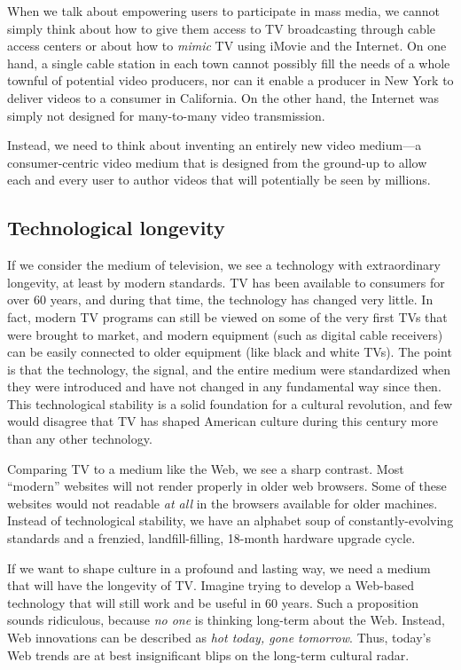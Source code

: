 \documentclass[12pt]{article}
\begin{document}
When we talk about empowering users to participate in mass media, we cannot simply think about how to give them access to TV broadcasting through cable access centers or about how to {\it mimic} TV using iMovie and the Internet.
On one hand, a single cable station in each town cannot possibly fill the needs of a whole townful of potential video producers, nor can it enable a producer in New York to deliver videos to a consumer in California.
On the other hand, the Internet was simply not designed for many-to-many video transmission.

Instead, we need to think about inventing an entirely new video medium---a consumer-centric video medium that is designed from the ground-up to allow each and every user to author videos that will potentially be seen by millions.

\subsection{Technological longevity}

If we consider the medium of television, we see a technology with extraordinary longevity, at least by modern standards.
TV has been available to consumers for over 60 years, and during that time, the technology has changed very little.
In fact, modern TV programs can still be viewed on some of the very first TVs that were brought to market, and modern equipment (such as digital cable receivers) can be easily connected to older equipment (like black and white TVs).
The point is that the technology, the signal, and the entire medium were standardized when they were introduced and have not changed in any fundamental way since then.
This technological stability is a solid foundation for a cultural revolution, and few would disagree that TV has shaped American culture during this century more than any other technology.

Comparing TV to a medium like the Web, we see a sharp contrast.
Most ``modern'' websites will not render properly in older web browsers.
Some of these websites would not readable {\it at all} in the browsers available for older machines.
Instead of technological stability, we have an alphabet soup of constantly-evolving standards and a frenzied, landfill-filling, 18-month hardware upgrade cycle.

If we want to shape culture in a profound and lasting way, we need a medium that will have the longevity of TV.
Imagine trying to develop a Web-based technology that will still work and be useful in 60 years.
Such a proposition sounds ridiculous, because {\it no one} is thinking long-term about the Web.
Instead, Web innovations can be described as {\it hot today, gone tomorrow}.
Thus, today's Web trends are at best insignificant blips on the long-term cultural radar.
\end{document}
